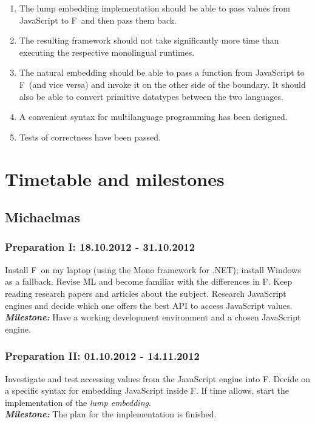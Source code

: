 \documentclass[12pt,a4paper, twoside]{article}
\newcommand{\fs}{F\nolinebreak\hspace{-.05em}\raisebox{.6ex}{\tiny\bf
    \#}}
\begin{document}
\begin{enumerate}

\item The lump embedding implementation should be able to pass values
  from JavaScript to \fs\ and then pass them back.

\item The resulting framework should not take significantly more time
  than executing the respective monolingual runtimes.

\item The natural embedding should be able to pass a function from
JavaScript to \fs\ (and vice versa) and invoke it on the other side of
the boundary. It should also be able to convert primitive datatypes
between the two languages.

\item A convenient syntax for multilanguage programming has been
  designed.

\item Tests of correctness have been passed.

\end{enumerate}

\section{Timetable and milestones}

\subsection*{Michaelmas}
\subsubsection*{Preparation I: 18.10.2012 - 31.10.2012} Install \fs\
on my laptop (using the Mono framework for .NET); install Windows as a
fallback. Revise ML and become familiar with the differences in
\fs. Keep reading research papers and articles about the
subject. Research JavaScript engines and decide which one offers the
best API to access JavaScript values.  \\\textbf{\emph{Milestone:}}
Have a working development environment and a chosen JavaScript engine.

\subsubsection*{Preparation II: 01.10.2012 - 14.11.2012 } Investigate
and test accessing values from the JavaScript engine into \fs. Decide
on a specific syntax for embedding JavaScript inside \fs. If time
allows, start the implementation of the \emph{lump embedding}.
\\\textbf{\emph{Milestone:}} The plan for the implementation is
finished.
\end{document}
